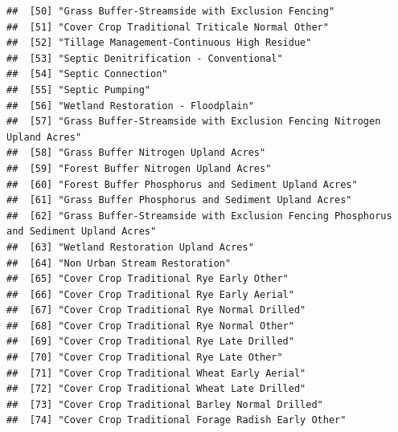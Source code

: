\documentclass[
]{article}
\begin{document}
\begin{verbatim}
##  [50] "Grass Buffer-Streamside with Exclusion Fencing"                                                 
##  [51] "Cover Crop Traditional Triticale Normal Other"                                                  
##  [52] "Tillage Management-Continuous High Residue"                                                     
##  [53] "Septic Denitrification - Conventional"                                                          
##  [54] "Septic Connection"                                                                              
##  [55] "Septic Pumping"                                                                                 
##  [56] "Wetland Restoration - Floodplain"                                                               
##  [57] "Grass Buffer-Streamside with Exclusion Fencing Nitrogen Upland Acres"                           
##  [58] "Grass Buffer Nitrogen Upland Acres"                                                             
##  [59] "Forest Buffer Nitrogen Upland Acres"                                                            
##  [60] "Forest Buffer Phosphorus and Sediment Upland Acres"                                             
##  [61] "Grass Buffer Phosphorus and Sediment Upland Acres"                                              
##  [62] "Grass Buffer-Streamside with Exclusion Fencing Phosphorus and Sediment Upland Acres"            
##  [63] "Wetland Restoration Upland Acres"                                                               
##  [64] "Non Urban Stream Restoration"                                                                   
##  [65] "Cover Crop Traditional Rye Early Other"                                                         
##  [66] "Cover Crop Traditional Rye Early Aerial"                                                        
##  [67] "Cover Crop Traditional Rye Normal Drilled"                                                      
##  [68] "Cover Crop Traditional Rye Normal Other"                                                        
##  [69] "Cover Crop Traditional Rye Late Drilled"                                                        
##  [70] "Cover Crop Traditional Rye Late Other"                                                          
##  [71] "Cover Crop Traditional Wheat Early Aerial"                                                      
##  [72] "Cover Crop Traditional Wheat Late Drilled"                                                      
##  [73] "Cover Crop Traditional Barley Normal Drilled"                                                   
##  [74] "Cover Crop Traditional Forage Radish Early Other"                                               

\end{verbatim}
\end{document}

